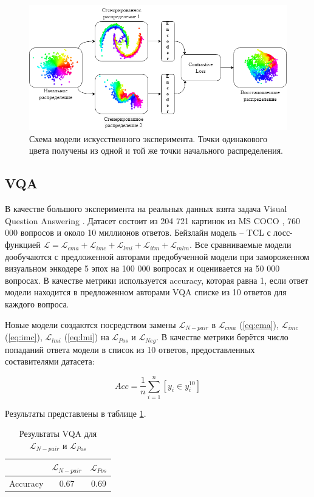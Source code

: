 \documentclass[a4paper, 14pt]{article}
\begin{document}
\begin{figure}[!ht]
    \includegraphics[scale = 0.65]{Pictures/Model.png}
    \caption{Схема модели искусственного эксперимента. Точки одинакового цвета получены из одной и той же точки начального распределения.}
    \label{fg:model}
\end{figure}

\subsection{VQA}
В качестве большого эксперимента на реальных данных взята задача Visual Question Answering \citep{VQA}. Датасет состоит из 204 721 картинок из MS COCO \citep{lin2015microsoft}, 760 000 вопросов и около 10 миллионов ответов. Бейзлайн модель -- TCL \citep{TCL} с лосс-функцией $\mathcal{L} = \mathcal{L}_{cma} + \mathcal{L}_{imc} + \mathcal{L}_{lmi} + \mathcal{L}_{itm} + \mathcal{L}_{mlm}$. Все сравниваемые модели дообучаются с предложенной авторами \citep{TCL} предобученной модели при замороженном визуальном энкодере 5 эпох на 100 000 вопросах и оценивается на 50 000 вопросах. В качестве метрики используется accuracy, которая равна 1, если ответ модели находится в предложенном авторами VQA списке из 10 ответов для каждого вопроса.

Новые модели создаются посредством замены $\mathcal{L}_{N-pair}$ в $\mathcal{L}_{cma}$ (\ref{eq:cma}), $\mathcal{L}_{imc}$ (\ref{eq:imc}), $\mathcal{L}_{lmi}$ (\ref{eq:lmi}) на $\mathcal{L}_{Pos}$ и $\mathcal{L}_{Neg}$. В качестве метрики берётся число попаданий ответа модели в список из 10 ответов, предоставленных составителями датасета:

\[Acc = \frac{1}{n}\sum\limits_{i = 1}^n[y_i \in y_i^{10}]\]

Результаты представлены в таблице \ref{res_vqa}.

\begin{table}
\begin{center}
\caption{Результаты VQA для $\mathcal{L}_{N-pair}$ и $\mathcal{L}_{Pos}$}
\begin{tabular}{| c | c | c |}
\hline
& $\mathcal{L}_{N-pair}$ & $\mathcal{L}_{Pos}$ \\ \hline
Accuracy & 0.67 & 0.69 \\ \hline
\end{tabular}
\label{res_vqa}
\end{center}
\end{table}
\end{document}
